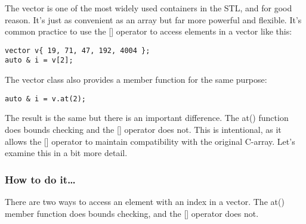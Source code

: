 
The vector is one of the most widely used containers in the STL, and for good reason. It's just as convenient as an array but far more powerful and flexible. It's common practice to use the [] operator to access elements in a vector like this:

\begin{lstlisting}[style=styleCXX]
vector v{ 19, 71, 47, 192, 4004 };
auto & i = v[2];
\end{lstlisting}

The vector class also provides a member function for the same purpose:

\begin{lstlisting}[style=styleCXX]
auto & i = v.at(2);
\end{lstlisting}

The result is the same but there is an important difference. The at() function does bounds checking and the [] operator does not. This is intentional, as it allows the [] operator to maintain compatibility with the original C-array. Let's examine this in a bit more detail.

\subsubsection{How to do it…}

There are two ways to access an element with an index in a vector. The at() member function does bounds checking, and the [] operator does not.

